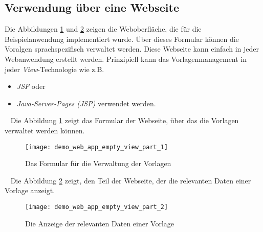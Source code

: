 \subsection{Verwendung über eine Webseite}
Die Abbildungen \ref{fig:demo_web_app_empty_view_part_1} und \ref{fig:demo_web_app_empty_view_part_2} zeigen die Weboberfläche, die für die Beispielanwendung implementiert wurde. Über dieses Formular können die Voralgen sprachspezifisch verwaltet werden. Diese Webseite kann einfach in jeder Webanwendung erstellt werden. Prinzipiell kann das Vorlagenmanagement in jeder \emph{View}-Technologie wie z.B.
\begin{itemize}
	\item\emph{JSF} oder
	\item\emph{Java-Server-Pages (JSP)} verwendet werden.
\end{itemize}
\ \newpage
Die Abbildung \ref{fig:demo_web_app_empty_view_part_1} zeigt das Formular der Webseite, über das die Vorlagen verwaltet werden können.
\ \begin{figure}[h]
\centering
\texttt{[image: demo\_web\_app\_empty\_view\_part\_1]}
\caption{Das Formular für die Verwaltung der Vorlagen}
\label{fig:demo_web_app_empty_view_part_1}
\end{figure}
\ \newline
Die Abbildung \ref{fig:demo_web_app_empty_view_part_2} zeigt, den Teil der Webseite, der die relevanten Daten einer Vorlage anzeigt.

\begin{figure}[h]
\centering
\texttt{[image: demo\_web\_app\_empty\_view\_part\_2]}
\caption{Die Anzeige der relevanten Daten einer Vorlage}
\label{fig:demo_web_app_empty_view_part_2}
\end{figure}
\ \newpage

